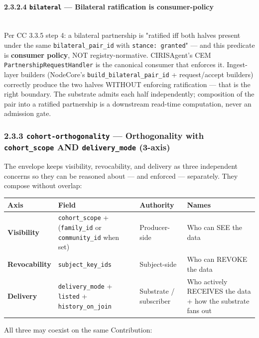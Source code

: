 \documentclass[11pt]{article}
\begin{document}
\paragraph{2.3.2.4 \texttt{bilateral} — Bilateral ratification is consumer-policy}\mbox{}\\


Per CC 3.3.5 step 4: a bilateral partnership is "ratified iff both halves present under the same \texttt{bilateral\_pair\_id} with \texttt{stance: granted}" — and this predicate is \textbf{consumer policy}, NOT registry-normative. CIRISAgent's CEM \texttt{PartnershipRequestHandler} is the canonical consumer that enforces it. Ingest-layer builders (NodeCore's \texttt{build\_bilateral\_pair\_id} + request/accept builders) correctly produce the two halves WITHOUT enforcing ratification — that is the right boundary. The substrate admits each half independently; composition of the pair into a ratified partnership is a downstream read-time computation, never an admission gate.


\subsubsection*{2.3.3 \texttt{cohort-orthogonality} — Orthogonality with \texttt{cohort\_scope} AND \texttt{delivery\_mode} (3-axis)}


The envelope keeps visibility, revocability, and delivery as three independent concerns so they can be reasoned about — and enforced — separately. They compose without overlap:


{\scriptsize
\begin{longtable}{|p{4.0cm}|p{4.0cm}|p{4.0cm}|p{4.0cm}|}\hline
\textbf{Axis} & \textbf{Field} & \textbf{Authority} & \textbf{Names} \\ \hline\endhead
\textbf{Visibility} & \texttt{cohort\_scope} + (\texttt{family\_id} or \texttt{community\_id} when set) & Producer-side & Who can SEE the data \\ \hline
\textbf{Revocability} & \texttt{subject\_key\_ids} & Subject-side & Who can REVOKE the data \\ \hline
\textbf{Delivery} & \texttt{delivery\_mode} + \texttt{listed} + \texttt{history\_on\_join} & Substrate / subscriber & Who actively RECEIVES the data + how the substrate fans out \\ \hline
\end{longtable}}


All three may coexist on the same Contribution:
\end{document}

